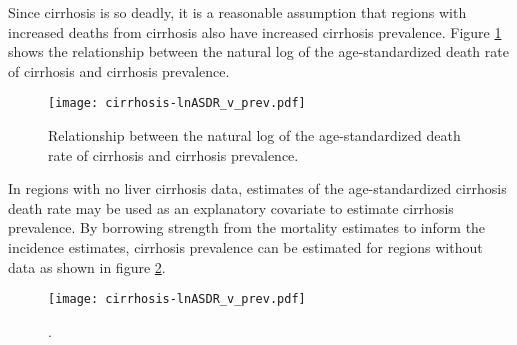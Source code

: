 Since cirrhosis is so deadly, it is a reasonable assumption that regions with increased deaths from cirrhosis also have increased cirrhosis prevalence.  Figure \ref{fig:app-cirrhosis asp} shows the relationship between the natural log of the age-standardized death rate of cirrhosis and cirrhosis prevalence.

    \begin{figure}[h]
        \begin{center}
            \texttt{[image: cirrhosis-lnASDR\_v\_prev.pdf]}
            \caption{Relationship between the natural log of the age-standardized death rate of cirrhosis and cirrhosis prevalence.}
            \label{fig:app-cirrhosis asp}
        \end{center}
    \end{figure}

In regions with no liver cirrhosis data, estimates of the age-standardized cirrhosis death rate may be used as an explanatory covariate to estimate cirrhosis prevalence.  By borrowing strength from the mortality estimates to inform the incidence estimates, cirrhosis prevalence can be estimated for regions without data as shown in figure \ref{fig:app-cirrhosis prev est}.

    \begin{figure}[h]
        \begin{center}
            \texttt{[image: cirrhosis-lnASDR\_v\_prev.pdf]}
            \caption{.}
            \label{fig:app-cirrhosis prev est}
        \end{center}
    \end{figure}

